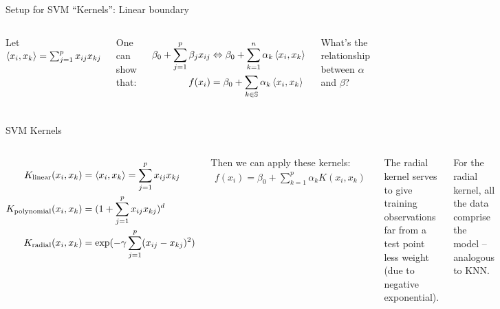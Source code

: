 \documentclass[mathserif, aspectratio=169]{beamer}
\begin{document}
\begin{frame}{Setup for SVM ``Kernels'': Linear boundary}



\begin{columns}
\vspace{10mm}

Let $\braket{x_i,x_k} = \sum_{j=1}^px_{ij}x_{kj}$

\vspace{5mm}

One can show that:

\begin{align*}
\beta_0 + \sum_{j=1}^p \beta_j x_{ij} &\Leftrightarrow \beta_0 + \sum_{k=1}^n \alpha_k \braket{x_i,x_k}\\
f(x_i) &= \beta_0 + \sum_{k\in \mathbb{S}} \alpha_k \braket{x_i,x_k}\\
\end{align*}

What's the relationship between $\alpha$ and $\beta$?
\end{columns}
\end{frame}


\begin{frame}{SVM Kernels}
\begin{columns}

\begin{align*}
K_\text{linear}(x_i,x_k) &= \braket{x_i,x_k} = \sum_{j=1}^px_{ij}x_{kj}\\
K_\text{polynomial}(x_i,x_k) &= (1+ \sum_{j=1}^px_{ij}x_{kj})^d\\
K_\text{radial}(x_i,x_k) &= \exp(-\gamma \sum_{j=1}^p(x_{ij}-x_{kj})^2)\\
\end{align*}

Then we can apply these kernels:
\begin{align*}
f(x_i) = \beta_0+\sum_{k=1}^p \alpha_k K(x_i,x_k) 
\end{align*}

The radial kernel serves to give training observations far from a test point less weight (due to negative exponential). 

\vspace{5mm}

For the radial kernel, all the data comprise the model -- analogous to KNN.  
\end{columns}

\end{frame}
\end{document}
